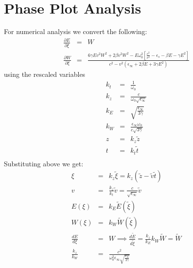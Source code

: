 \documentclass{article}[12pt]
\theoremstyle{plain}
\begin{document}
\section{Phase Plot Analysis}
For numerical analysis we convert the following:
\begin{eqnarray}
\frac{\partial E}{\partial \xi} & = & W \nonumber \\
\frac{\partial W}{\partial \xi} & = & \frac{6\gamma E v^2 W^2 +2\beta v^2W^2
-E\omega_0^2[\frac{c^2}{v^2} - \epsilon_s  -\beta E -\gamma E^2]}
{c^2 - v^2(\epsilon_\infty +2\beta E + 3\gamma E^2)}
\end{eqnarray}
using the rescaled variables
\begin{eqnarray}
k_t & = & \frac{1}{\omega_0} \nonumber \\
k_z & = & \frac{c}{\omega_0\sqrt{\epsilon_\infty}} \nonumber \\
k_E & = & \sqrt{\frac{\epsilon_\infty}{3\gamma}} \nonumber \\
k_W & = & \frac{\epsilon_\infty \omega_0}{c\sqrt{3\gamma}}\nonumber \\
z & = & k_z\widetilde{z}\nonumber \\
t & = & k_t\widetilde{t}\nonumber \\
\end{eqnarray}
Substituting above we get:
\begin{eqnarray}
\xi & = & k_z \widetilde{\xi} = k_z( \widetilde{z}-\widetilde{v}\widetilde{t}) \nonumber \\
v & = & \frac{k_z}{k_t} \widetilde{v} = \frac{c}{\sqrt{\epsilon_\infty}} \widetilde{v} \nonumber \\
E(\xi) & = & k_E \widetilde{E}(\widetilde{\xi}) \nonumber \\
W(\xi) & = & k_W \widetilde{W}(\widetilde{\xi}) \nonumber \\
\frac{dE}{d\xi} & = & W \implies \frac{d\widetilde{E}}{d\widetilde{\xi}} = \frac{k_z}{k_E} k_W \widetilde{W} = \widetilde{W} \nonumber \\
\frac{k_z}{k_W} & = & \frac{c^2}{\omega_0^2 \epsilon_\infty \sqrt{\frac{\epsilon_\infty}{3\gamma}}} \nonumber 
\end{eqnarray}
\end{document}
